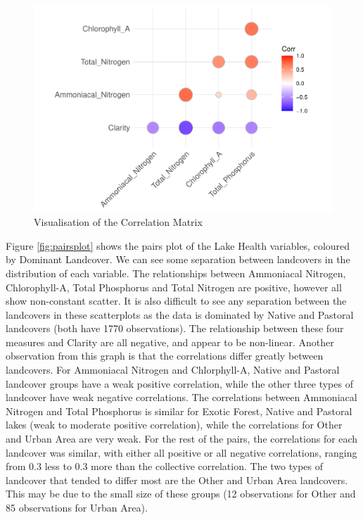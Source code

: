 \documentclass[
]{article}
\begin{document}
\begin{figure}
\centering
\includegraphics{Final-Report_files/figure-latex/correlationplot-1.pdf}
\caption{\label{fig:correlationplot}Visualisation of the Correlation Matrix}
\end{figure}

Figure \ref{fig:pairsplot} shows the pairs plot of the Lake Health variables, coloured by Dominant Landcover. We can see some separation between landcovers in the distribution of each variable. The relationships between Ammoniacal Nitrogen, Chlorophyll-A, Total Phosphorus and Total Nitrogen are positive, however all show non-constant scatter. It is also difficult to see any separation between the landcovers in these scatterplots as the data is dominated by Native and Pastoral landcovers (both have 1770 observations). The relationship between these four measures and Clarity are all negative, and appear to be non-linear. Another observation from this graph is that the correlations differ greatly between landcovers. For Ammoniacal Nitrogen and Chlorphyll-A, Native and Pastoral landcover groups have a weak positive correlation, while the other three types of landcover have weak negative correlations. The correlations between Ammoniacal Nitrogen and Total Phosphorus is similar for Exotic Forest, Native and Pastoral lakes (weak to moderate positive correlation), while the correlations for Other and Urban Area are very weak. For the rest of the pairs, the correlations for each landcover was similar, with either all positive or all negative correlations, ranging from 0.3 less to 0.3 more than the collective correlation. The two types of landcover that tended to differ most are the Other and Urban Area landcovers. This may be due to the small size of these groups (12 observations for Other and 85 observations for Urban Area).
\end{document}
